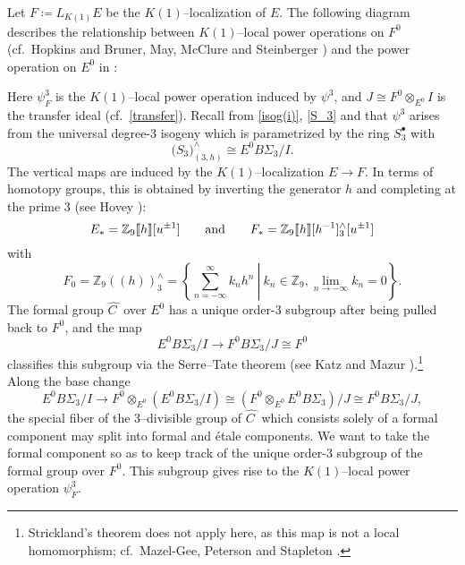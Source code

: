\documentclass[microtype]{gtpart}     %
\theoremstyle{remark}
\theoremstyle{definition}
\newcommand{\mb}[1]{\mathbb{#1}}
\newcommand{\BZ}{{\mb Z}}
\newcommand{\HC}{\widehat{C~}\!}
\newcommand{\ad}{{\rm and}}
\newcommand{\ce}{\coloneqq}
\newcommand{\p}{\psi^3}
\newcommand{\s}{S^\bullet}
\newcommand{\isog}[1]{\fullref{prop:isog}\thinspace \eqref{isog(#1)}}
\begin{document}
Let $F \ce L_{K(1)} E$ be the $K(1)$--localization of $E$.  The following 
diagram describes the relationship between $K(1)$--local power operations on 
$F^0$ (cf.~Hopkins \cite[Section 3]{hopkins} and Bruner, May, McClure and 
Steinberger \cite[Section IX.3]{H_infty}) and the power operation on $E^0$ in 
: 
\begin{center}
\end{center}
Here $\psi_F^3$ is the $K(1)$--local power operation induced by $\p$, and 
$J \cong F^0 \otimes_{E^0} I$ is the transfer ideal (cf.~\eqref{transfer}).  
Recall from \isog{i}, \eqref{S_3} and  that $\p$ arises 
from the universal degree-3 isogeny which is parametrized by the ring $\s_3$ 
with 
\[
 \big( S_3 \big)_{(3,h)}^\wedge \cong E^0 B\Sigma_3 / I.  
\]
The vertical maps are induced by the $K(1)$--localization $E \to F$.  In 
terms of homotopy groups, this is obtained by inverting the generator $h$ and 
completing at the prime 3 (see Hovey \cite[Corollary 1.5.5]{hovey}): 
\[
 E_* = \BZ_9 \llbracket h \rrbracket [u^{\pm1}] \qquad \ad \qquad F_* = \BZ_9 \llbracket h \rrbracket [h^{-1}]_3^\wedge [u^{\pm1}] 
\]
with 
\[
 F_0 = \BZ_9 (\!(h)\!)_3^\wedge = \left.\left\{\sum_{n = -\infty}^{\infty} k_n h^n~\right|~k_n \in \BZ_9, \lim_{n \to -\infty} k_n = 0\right\}.  
\]
The formal group $\HC$ over $E^0$ has a unique order-3 subgroup after being 
pulled back to $F^0$, and the map 
\[
 E^0 B\Sigma_3 / I \to F^0 B\Sigma_3 / J \cong F^0 
\]
classifies this subgroup via the Serre--Tate theorem (see Katz and Mazur 
\cite[Theorem 2.9.1]{KM}).\footnote{Strickland's theorem 
\cite[Theorem 1.1]{Str98} does not apply here, as this map is not a local 
homomorphism; cf.~Mazel-Gee, Peterson and Stapleton \cite{MGPS}.  }  Along 
the base change 
\[
 E^0 B\Sigma_3 / I \to F^0 \otimes_{E^0} (E^0 B\Sigma_3 / I) \cong (F^0 \otimes_{E^0} E^0 B\Sigma_3) / J \cong F^0 B\Sigma_3 / J, 
\]
the special fiber of the 3--divisible group of $\HC$ which consists solely of 
a formal component may split into formal and \'etale components.  We want to 
take the formal component so as to keep track of the unique order-3 subgroup 
of the formal group over $F^0$.  This subgroup gives rise to the 
$K(1)$--local power operation $\psi_F^3$.  
\end{document}
